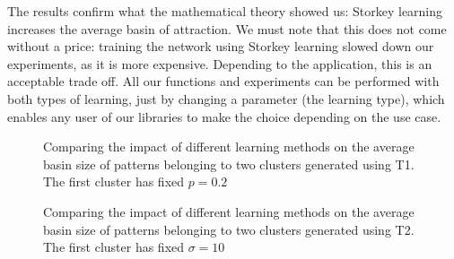The results confirm what the mathematical theory showed us: Storkey learning
increases the average basin of attraction. We must note that this does not
come without a price: training the network using Storkey learning slowed down
our experiments, as it is more expensive. Depending to the application, this
is an acceptable trade off. All our functions and experiments can be performed
with both types of learning, just by changing a parameter (the learning type),
which enables any user of our libraries to make the choice depending on the
use case.

\begin{figure}[h]
  \centering
  
\caption{Comparing the impact of different learning methods on the average basin size of patterns belonging to two clusters generated using T1. The first cluster has fixed $p = 0.2$}
\label{fig:plot-storkey-T1-twoclusters}
\end{figure}

\begin{figure}[h]
  \centering
  
\caption{Comparing the impact of different learning methods on the average basin size of patterns belonging to two clusters generated using T2. The first cluster has fixed $\sigma = 10$}
\label{fig:plot-storkey-T2-twoclusters}
\end{figure}
